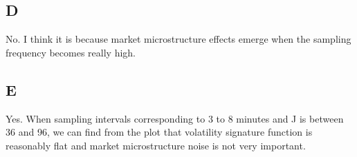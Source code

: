 \documentclass{report}
\begin{document}
\subsection{D}
No. I think it is because market microstructure effects emerge when the sampling frequency becomes really high.

\subsection{E}
Yes. When sampling intervals corresponding to 3 to 8 minutes and J is between 36 and 96, we can find from the plot that volatility signature function is reasonably flat and market microstructure noise is not very important. 
\end{document}
